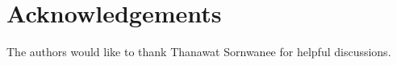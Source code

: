 \section*{Acknowledgements}
The authors would like to thank Thanawat Sornwanee for helpful discussions.
